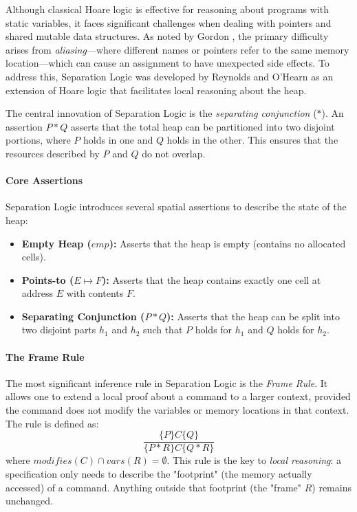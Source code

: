 \documentclass[sigconf]{acmart}
\begin{document}
Although classical Hoare logic is effective for reasoning about programs with static variables, it faces significant challenges when dealing with pointers and shared mutable data structures. As noted by Gordon \cite{gordon2014hoare}, the primary difficulty arises from \textit{aliasing}—where different names or pointers refer to the same memory location—which can cause an assignment to have unexpected side effects. To address this, Separation Logic was developed by Reynolds \cite{reynolds2002separation} and O'Hearn \cite{ohearn2001local} as an extension of Hoare logic that facilitates local reasoning about the heap.

The central innovation of Separation Logic is the \textit{separating conjunction} ($\ast$). An assertion $P \ast Q$ asserts that the total heap can be partitioned into two disjoint portions, where $P$ holds in one and $Q$ holds in the other. This ensures that the resources described by $P$ and $Q$ do not overlap.

\paragraph{Core Assertions}
Separation Logic introduces several spatial assertions to describe the state of the heap:
\begin{itemize}
    \item \textbf{Empty Heap ($emp$):} Asserts that the heap is empty (contains no allocated cells).
    \item \textbf{Points-to ($E \mapsto F$):} Asserts that the heap contains exactly one cell at address $E$ with contents $F$.
    \item \textbf{Separating Conjunction ($P \ast Q$):} Asserts that the heap can be split into two disjoint parts $h_1$ and $h_2$ such that $P$ holds for $h_1$ and $Q$ holds for $h_2$.
\end{itemize}

\paragraph{The Frame Rule}
The most significant inference rule in Separation Logic is the \textit{Frame Rule}. It allows one to extend a local proof about a command to a larger context, provided the command does not modify the variables or memory locations in that context. The rule is defined as:
\[
\frac{\{P\} C \{Q\}}{\{P \ast R\} C \{Q \ast R\}}
\]
where $modifies(C) \cap vars(R) = \emptyset$. This rule is the key to \textit{local reasoning}: a specification only needs to describe the "footprint" (the memory actually accessed) of a command. Anything outside that footprint (the "frame" $R$) remains unchanged.
\end{document}
